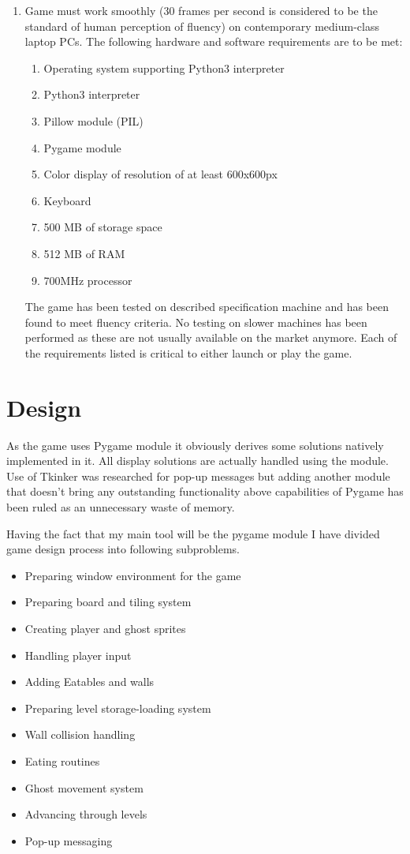 \documentclass[11pt,a4paper]{report}
\begin{document}
\begin{enumerate}
\begin{enumerate}
					\end{enumerate} 
				\item
					Game must work smoothly (30 frames per second is considered to be the standard of human perception of fluency) on contemporary medium-class laptop PCs. The following hardware and software requirements are to be met:
					\begin{enumerate}
						\item
							Operating system supporting Python3 interpreter
						\item
							Python3 interpreter
						\item
							Pillow module (PIL)
						\item
							Pygame module
						\item
							Color display of resolution of at least 600x600px
						\item
							Keyboard
						\item
							500 MB of storage space
						\item
							512 MB of RAM
						\item
							700MHz processor
					\end{enumerate}
					The game has been tested on described specification machine and has been found to meet fluency criteria. No testing on slower machines has been performed as these are not usually available on the market anymore. Each of the requirements listed is critical to either launch or play the game.
			\end{enumerate}
			
	\chapter{Design}
		\newpage
		As the game uses Pygame module it obviously derives some solutions natively implemented in it. All display solutions are actually handled using the module. Use of Tkinker was researched for pop-up messages but adding another module that doesn't bring any outstanding functionality above capabilities of Pygame has been ruled as an unnecessary waste of memory.
		
		Having the fact that my main tool will be the pygame module I have divided game design process into following subproblems.
		\begin{itemize}
			\item
				Preparing window environment for the game
			\item
				Preparing board and tiling system
			\item
				Creating player and ghost sprites
			\item
				Handling player input
			\item
				Adding Eatables and walls
			\item
				Preparing level storage-loading system
			\item
				Wall collision handling
			\item
				Eating routines
			\item
				Ghost movement system
			\item
				Advancing through levels
			\item
				Pop-up messaging
		\end{itemize}
\end{document}
